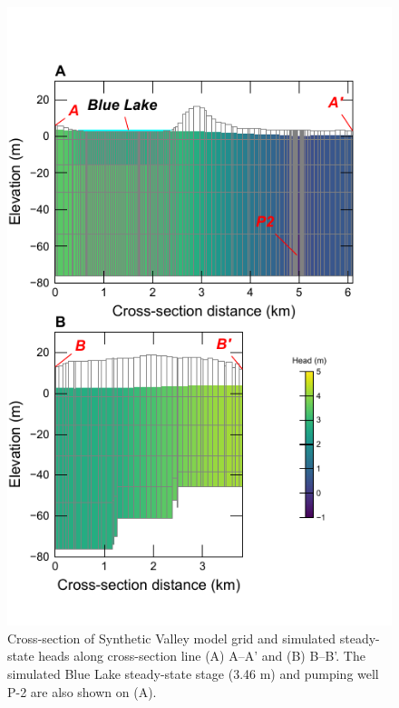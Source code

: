 \documentclass[12pt, oneside]{article}  	%
\begin{document}
\begin{figure}[ht!]
	\begin{center}
		\includegraphics{figures/mv_voronoi_xsection.pdf}
	\end{center}
	\caption{Cross-section of Synthetic Valley model grid and simulated steady-state heads along cross-section line (A) A--A' and (B) B--B'. The simulated Blue Lake steady-state stage (3.46 m) and pumping well P-2 are also shown on (A).}
	\label{fig:mvxsection}
\end{figure}
\end{document}
